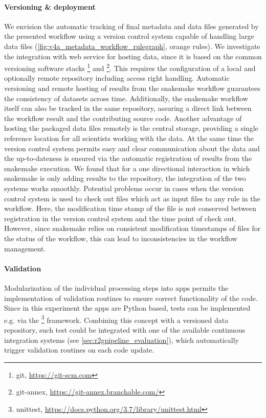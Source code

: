 \paragraph{Versioning \& deployment}
We envision the automatic tracking of final metadata and data files generated by the presented workflow using a version control system capable of handling large data files (\cref{fig:v4a_metadata_workflow_rulegraph}, orange rules). We investigate the integration with  web service for hosting data, since it is based on the common versioning software stacks \footnote{git, \url{https://git-scm.com}} and \footnote{git-annex, \url{https://git-annex.branchable.com/}}. This requires the configuration of a local and optionally remote repository including access right handling. Automatic versioning and remote hosting of results from the snakemake workflow guarantees the consistency of datasets across time. Additionally, the snakemake workflow itself can also be tracked in the same repository, assuring a direct link between the workflow result and the contributing source code.
Another advantage of hosting the packaged data files remotely is the central storage, providing a single reference location for all scientists working with the data. At the same time the version control system permits easy and clear communication about the data and the up-to-dateness is ensured via the automatic registration of results from the snakemake execution.
We found that for a one directional interaction in which snakemake is only adding results to the repository, the integration of the two systems works smoothly. Potential problems occur in cases when the version control system is used to check out files which act as input files to any rule in the workflow. Here, the modification time stamp of the file is not conserved between registration in the version control system and the time point of check out. However, since snakemake relies on consistent modification timestamps of files for the status of the workflow, this can lead to inconsistencies in the workflow management.

\paragraph{Validation}
Modularization of the individual processing steps into apps permits the implementation of validation routines to ensure correct functionality of the code. Since in this experiment the apps are Python based, tests can be implemented e.g. via the \footnote{unittest, \url{https://docs.python.org/3.7/library/unittest.html}} framework. Combining this concept with a versioned data repository, such test could be integrated with one of the available continuous integration systems (see \cref{sec:r2gpipeline_evaluation}), which automatically trigger validation routines on each code update.

